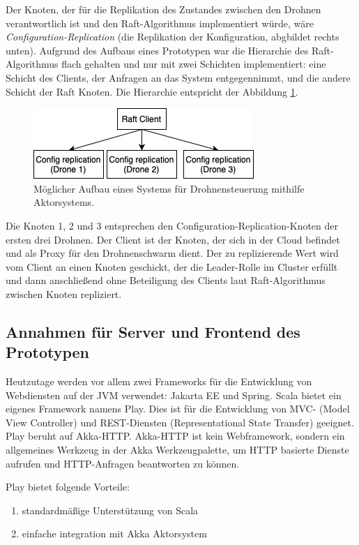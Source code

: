 Der Knoten, der für die Replikation des Zustandes zwischen den Drohnen verantwortlich ist und den Raft-Algorithmus implementiert würde, wäre \textit{Configuration-Replication} (die Replikation der Konfiguration, abgbildet rechts unten). Aufgrund des Aufbaus eines Prototypen war die Hierarchie des Raft-Algorithmus flach gehalten und nur mit zwei Schichten implementiert: eine Schicht des Clients, der Anfragen an das System entgegennimmt, und die andere Schicht der Raft Knoten. Die Hierarchie entspricht der Abbildung \ref{fig:hierarchy2}.

\begin{figure}
	\centering
	\includegraphics[width=0.7\linewidth]{images/6_hierarchy_2}
	\caption{Möglicher Aufbau eines Systems für Drohnensteuerung mithilfe Aktorsystems.}
	\label{fig:hierarchy2}
\end{figure}

Die Knoten 1, 2 und 3 entsprechen den Configuration-Replication-Knoten der ersten drei Drohnen. Der Client ist der Knoten, der sich in der Cloud befindet und als Proxy für den Drohnenschwarm dient. Der zu replizierende Wert wird vom Client an einen Knoten geschickt, der die Leader-Rolle im Cluster erfüllt und dann anschließend ohne Beteiligung des Clients laut Raft-Algorithmus zwischen Knoten repliziert.

\subsection{Annahmen für Server und Frontend des Prototypen}

Heutzutage werden vor allem zwei Frameworks für die Entwicklung von Webdiensten auf der JVM verwendet: Jakarta EE und Spring. Scala bietet ein eigenes Framework namens Play. Dies ist für die Entwicklung von  MVC- (Model View Controller) und REST-Diensten (Representational State Transfer) geeignet. Play beruht auf Akka-HTTP. Akka-HTTP ist kein Webframework, sondern ein allgemeines Werkzeug in der Akka Werkzeugpalette, um HTTP basierte Dienste aufrufen und HTTP-Anfragen beantworten zu können.

Play bietet folgende Vorteile:

\begin{enumerate}
	\item standardmäßige Unterstützung von Scala
	
	\item einfache integration mit Akka Aktorsystem
\end{enumerate}

